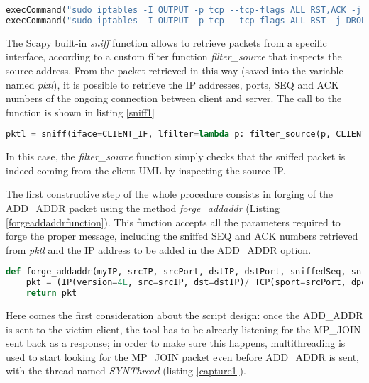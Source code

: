 \begin{lstlisting}[language=python, caption=\textit{Disable RST outgoing packets}, label=norst]
execCommand("sudo iptables -I OUTPUT -p tcp --tcp-flags ALL RST,ACK -j DROP", shell = True)
execCommand("sudo iptables -I OUTPUT -p tcp --tcp-flags ALL RST -j DROP", shell = True)
\end{lstlisting}

The Scapy built-in \textit{sniff} function allows to retrieve packets from a specific interface, according to a custom filter function \textit{filter\_source} that inspects the source address. From the packet retrieved in this way (saved into the variable named \textit{pktl}), it is possible to retrieve the IP addresses, ports, SEQ and ACK numbers of the ongoing connection between client and server. The call to the function is shown in listing \ref{sniff1}

\begin{lstlisting}[language=python, caption=\textit{Sniffing a first packet from the client}, label=sniff1]
pktl = sniff(iface=CLIENT_IF, lfilter=lambda p: filter_source(p, CLIENT_IP), count=1)
\end{lstlisting}

In this case, the \textit{filter\_source} function simply checks that the sniffed packet is indeed coming from the client UML by inspecting the source IP. 

The first constructive step of the whole procedure consists in forging of the ADD\_ADDR packet using the method \textit{forge\_addaddr} (Listing \ref{forgeaddaddrfunction}). This function accepts all the parameters required to forge the proper message, including the sniffed SEQ and ACK numbers retrieved from \textit{pktl} and the IP address to be added in the ADD\_ADDR option.

\begin{lstlisting}[language=python, caption=\textit{forge\_addaddr method}, label=forgeaddaddrfunction] 
def forge_addaddr(myIP, srcIP, srcPort, dstIP, dstPort, sniffedSeq, sniffedAck):
    pkt = (IP(version=4L, src=srcIP, dst=dstIP)/ TCP(sport=srcPort, dport=dstPort, flags="A", seq=sniffedSeq, ack=sniffedAck, options=[TCPOption_MP(mptcp=MPTCP_AddAddr(address_id=ADDRESS_ID, adv_addr=myIP))]))
    return pkt
\end{lstlisting}

Here comes the first consideration about the script design: once the ADD\_ADDR is sent to the victim client, the tool has to be already listening for the MP\_JOIN sent back as a response; in order to make sure this happens, multithreading is used to start looking for the MP\_JOIN packet even before ADD\_ADDR is sent, with the thread named \textit{SYNThread} (listing \ref{capture1}). 


